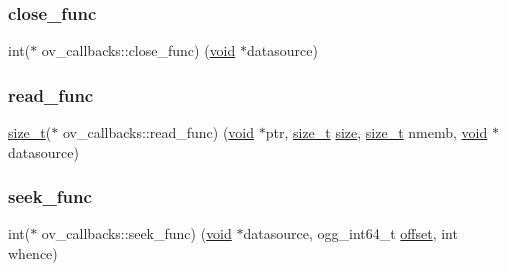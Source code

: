 \subsubsection{\texorpdfstring{close\+\_\+func}{close\_func}}
{\footnotesize\ttfamily int($\ast$ ov\+\_\+callbacks\+::close\+\_\+func) (\hyperlink{_s_d_l__opengles2__gl2ext_8h_ae5d8fa23ad07c48bb609509eae494c95}{void} $\ast$datasource)}

\mbox{\label{structov__callbacks_a301b93b9f0436e5bde6dbdeb0edeae77}} 
\subsubsection{\texorpdfstring{read\+\_\+func}{read\_func}}
{\footnotesize\ttfamily \hyperlink{_s_d_l__config_8h_a7c94ea6f8948649f8d181ae55911eeaf}{size\+\_\+t}($\ast$ ov\+\_\+callbacks\+::read\+\_\+func) (\hyperlink{_s_d_l__opengles2__gl2ext_8h_ae5d8fa23ad07c48bb609509eae494c95}{void} $\ast$ptr, \hyperlink{_s_d_l__config_8h_a7c94ea6f8948649f8d181ae55911eeaf}{size\+\_\+t} \hyperlink{_s_d_l__opengl__glext_8h_a3d1e3edfcf61ca2d831883e1afbad89e}{size}, \hyperlink{_s_d_l__config_8h_a7c94ea6f8948649f8d181ae55911eeaf}{size\+\_\+t} nmemb, \hyperlink{_s_d_l__opengles2__gl2ext_8h_ae5d8fa23ad07c48bb609509eae494c95}{void} $\ast$datasource)}

\mbox{\label{structov__callbacks_aa49d8079756c1c26e2ba9b974e463dfa}} 
\subsubsection{\texorpdfstring{seek\+\_\+func}{seek\_func}}
{\footnotesize\ttfamily int($\ast$ ov\+\_\+callbacks\+::seek\+\_\+func) (\hyperlink{_s_d_l__opengles2__gl2ext_8h_ae5d8fa23ad07c48bb609509eae494c95}{void} $\ast$datasource, ogg\+\_\+int64\+\_\+t \hyperlink{_s_d_l__opengl__glext_8h_ac915cd848f42b26af51745f204a3b9af}{offset}, int whence)}

\mbox{\label{structov__callbacks_ab078f3f386b7c58e9fab2ede904e0e36}} 
